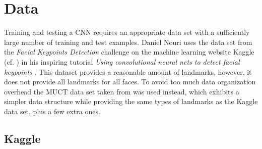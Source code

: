 \documentclass[11pt, a4paper]{article}
\begin{document}

\section{Data}
\label{sec:data}

Training and testing a \ac{CNN} requires an appropriate data set with a sufficiently large number of training and test examples. Daniel Nouri uses the data set from the \emph{Facial Keypoints Detection} challenge on the machine learning website Kaggle (cf. \cite{kaggle}) in his inspiring tutorial \emph{Using convolutional neural nets to detect facial keypoints} \cite{nouri-tutorial}. This dataset provides a reasonable amount of landmarks, however, it does not provide all landmarks for all faces. To avoid too much data organization overhead the \ac{MUCT} data set taken from \cite{muct} was used instead, which exhibits a simpler data structure while providing the same types of landmarks as the Kaggle data set, plus a few extra ones.

\subsection{Kaggle}
\end{document}
